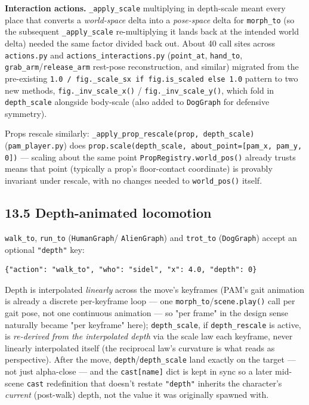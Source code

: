 \documentclass[
  11pt,
]{book}
\begin{document}
\textbf{Interaction actions.} \texttt{\_apply\_scale} multiplying in
depth-scale meant every place that converts a \emph{world-space} delta
into a \emph{pose-space} delta for \texttt{morph\_to} (so the
subsequent \texttt{\_apply\_scale} re-multiplying it lands back at the
intended world delta) needed the same factor divided back out. About
40 call sites across \texttt{actions.py} and
\texttt{actions\_interactions.py} (\texttt{point\_at},
\texttt{hand\_to}, \texttt{grab\_arm}/\texttt{release\_arm} rest-pose
reconstruction, and similar) migrated from the pre-existing
\texttt{1.0 / fig.\_scale\_sx if fig.is\_scaled else 1.0} pattern to
two new methods, \texttt{fig.\_inv\_scale\_x()} /
\texttt{fig.\_inv\_scale\_y()}, which fold in \texttt{depth\_scale}
alongside body-scale (also added to \texttt{DogGraph} for defensive
symmetry).

Props rescale similarly: \texttt{\_apply\_prop\_rescale(prop,
depth\_scale)} (\texttt{pam\_player.py}) does
\texttt{prop.scale(depth\_scale, about\_point=[pam\_x, pam\_y, 0])}
--- scaling about the same point \texttt{PropRegistry.world\_pos()}
already trusts means that point (typically a prop's floor-contact
coordinate) is provably invariant under rescale, with no changes
needed to \texttt{world\_pos()} itself.

\subsection{\texorpdfstring{13.5 Depth-animated locomotion}{13.5 Depth-animated locomotion}}\label{depth-animated-locomotion}

\texttt{walk\_to}, \texttt{run\_to} (\texttt{HumanGraph}/
\texttt{AlienGraph}) and \texttt{trot\_to} (\texttt{DogGraph}) accept
an optional \texttt{"depth"} key:

\begin{verbatim}
{"action": "walk_to", "who": "sidel", "x": 4.0, "depth": 0}
\end{verbatim}

Depth is interpolated \emph{linearly} across the move's keyframes
(PAM's gait animation is already a discrete per-keyframe loop --- one
\texttt{morph\_to}/\texttt{scene.play()} call per gait pose, not one
continuous animation --- so "per frame" in the design sense naturally
became "per keyframe" here); \texttt{depth\_scale}, if
\texttt{depth\_rescale} is active, is \emph{re-derived from the
interpolated depth} via the scale law each keyframe, never linearly
interpolated itself (the reciprocal law's curvature is what reads as
perspective). After the move, \texttt{depth}/\texttt{depth\_scale}
land exactly on the target --- not just alpha-close --- and the
\texttt{cast[name]} dict is kept in sync so a later mid-scene
\texttt{cast} redefinition that doesn't restate \texttt{"depth"}
inherits the character's \emph{current} (post-walk) depth, not the
value it was originally spawned with.
\end{document}
